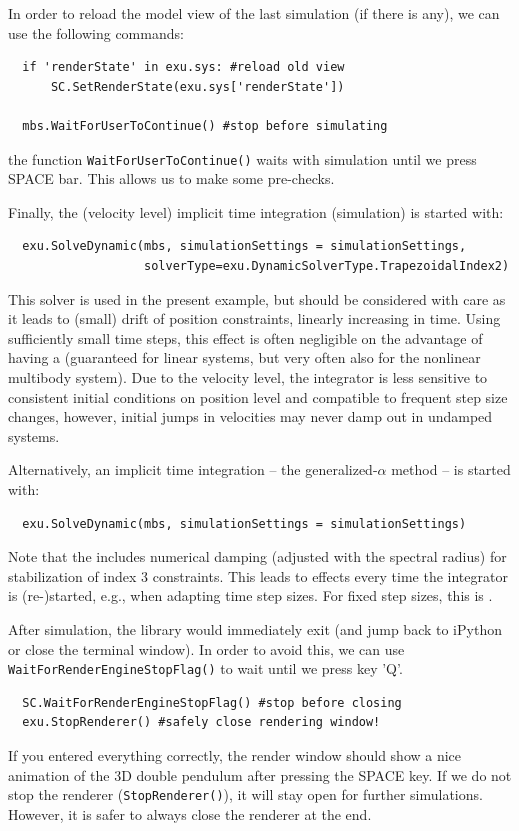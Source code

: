 \noindent In order to reload the model view of the last simulation (if there is any), we can use the following commands:
\pythonstyle\begin{lstlisting}
  if 'renderState' in exu.sys: #reload old view
      SC.SetRenderState(exu.sys['renderState'])

  mbs.WaitForUserToContinue() #stop before simulating
\end{lstlisting}
the function \texttt{WaitForUserToContinue()} waits with simulation until we press SPACE bar. This allows us to make some pre-checks.

\noindent Finally, the  (velocity level) implicit time integration (simulation) is started with:
\pythonstyle\begin{lstlisting}
  exu.SolveDynamic(mbs, simulationSettings = simulationSettings,
                   solverType=exu.DynamicSolverType.TrapezoidalIndex2)
\end{lstlisting}
This solver is used in the present example, but should be considered with care as it leads to (small) drift of position constraints, linearly increasing in time. Using sufficiently small time steps, this effect is often negligible on the advantage of having a  (guaranteed for linear systems, but very often also for the nonlinear multibody system). Due to the velocity level, the integrator is less sensitive to consistent initial conditions on position level and compatible to frequent step size changes, however, initial jumps in velocities may never damp out in undamped systems.

\noindent Alternatively, an  implicit time integration -- the generalized-$\alpha$ method -- is started with:
\pythonstyle\begin{lstlisting}
  exu.SolveDynamic(mbs, simulationSettings = simulationSettings)
\end{lstlisting}
Note that the  includes numerical damping (adjusted with the spectral radius) for stabilization of index 3 constraints. This leads to effects every time the integrator is (re-)started, e.g., when adapting time step sizes. For fixed step sizes, this is .

\noindent After simulation, the library would immediately exit (and jump back to iPython or close the terminal window). In order to avoid this, we can use \texttt{WaitForRenderEngineStopFlag()} to wait until we press key 'Q'.
\pythonstyle\begin{lstlisting}
  SC.WaitForRenderEngineStopFlag() #stop before closing
  exu.StopRenderer() #safely close rendering window!
\end{lstlisting}
If you entered everything correctly, the render window should show a nice animation of the 3D double pendulum after pressing the SPACE key. 
If we do not stop the renderer (\texttt{StopRenderer()}), it will stay open for further simulations. However, it is safer to always close the renderer at the end.

